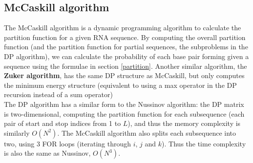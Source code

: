 \documentclass[12pt]{article}
\begin{document}
\subsection{McCaskill algorithm}
The McCaskill algorithm is a dynamic programming algorithm to calculate the partition function for a given RNA sequence. By computing the overall partition function (and the partition function for partial sequences, the subproblems in the DP algorithm), we can calculate the probability of each base pair forming given a sequence using the formulae in section \ref{partition}. Another similar algorithm, the \textbf{Zuker algorithm}, has the same DP structure as McCaskill, but only computes the minimum energy structure (equivalent to using a max operator in the DP recursion instead of a sum operator)\\[10pt]
The DP algorithm has a similar form to the Nussinov algorithm: the DP matrix is two-dimensional, computing the partition function for each subsequence (each pair of start and stop indices from 1 to $L$), and thus the memory complexity is similarly $O(N^2)$. The McCaskill algorithm also splits each subsequence into two, using 3 FOR loops (iterating through $i$, $j$ and $k$). Thus the time complexity is also the same as Nussinov, $O(N^3)$.
\end{document}
